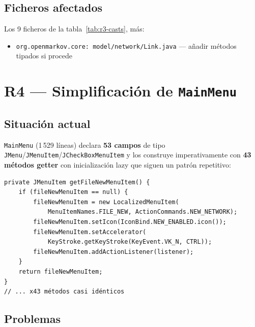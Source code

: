 \documentclass[12pt,a4paper]{article}
\newcommand{\code}[1]{\texttt{#1}}
\newcommand{\clase}[1]{\texttt{#1}}
\begin{document}
\subsection{Ficheros afectados}

Los 9 ficheros de la tabla~\ref{tab:r3-casts}, más:
\begin{itemize}[nosep]
  \item \code{org.openmarkov.core: model/network/Link.java} --- añadir
        métodos tipados si procede
\end{itemize}

\section{R4 --- Simplificación de \clase{MainMenu}}
\label{sec:r4}

\subsection{Situación actual}

\clase{MainMenu} (1\,529 líneas) declara \textbf{53 campos} de tipo
\code{JMenu}/\code{JMenuItem}/\code{JCheckBoxMenuItem} y los
construye imperativamente con \textbf{43 métodos getter} con
inicialización lazy que siguen un patrón repetitivo:

\begin{lstlisting}[caption={Patrón repetitivo de construcción de ítems de menú}]
private JMenuItem getFileNewMenuItem() {
    if (fileNewMenuItem == null) {
        fileNewMenuItem = new LocalizedMenuItem(
            MenuItemNames.FILE_NEW, ActionCommands.NEW_NETWORK);
        fileNewMenuItem.setIcon(IconBind.NEW_ENABLED.icon());
        fileNewMenuItem.setAccelerator(
            KeyStroke.getKeyStroke(KeyEvent.VK_N, CTRL));
        fileNewMenuItem.addActionListener(listener);
    }
    return fileNewMenuItem;
}
// ... x43 métodos casi idénticos
\end{lstlisting}

\subsection{Problemas}
\end{document}
